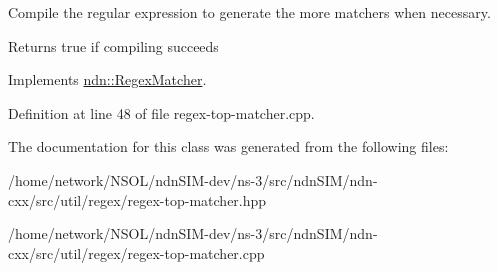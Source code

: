 Compile the regular expression to generate the more matchers when necessary. 

\begin{DoxyReturn}{Returns}
true if compiling succeeds 
\end{DoxyReturn}


Implements \hyperlink{classndn_1_1RegexMatcher_a95189df49e9119adcced9b555a721e9a}{ndn\+::\+Regex\+Matcher}.



Definition at line 48 of file regex-\/top-\/matcher.\+cpp.



The documentation for this class was generated from the following files\+:\begin{DoxyCompactItemize}
\item 
/home/network/\+N\+S\+O\+L/ndn\+S\+I\+M-\/dev/ns-\/3/src/ndn\+S\+I\+M/ndn-\/cxx/src/util/regex/regex-\/top-\/matcher.\+hpp\item 
/home/network/\+N\+S\+O\+L/ndn\+S\+I\+M-\/dev/ns-\/3/src/ndn\+S\+I\+M/ndn-\/cxx/src/util/regex/regex-\/top-\/matcher.\+cpp\end{DoxyCompactItemize}
